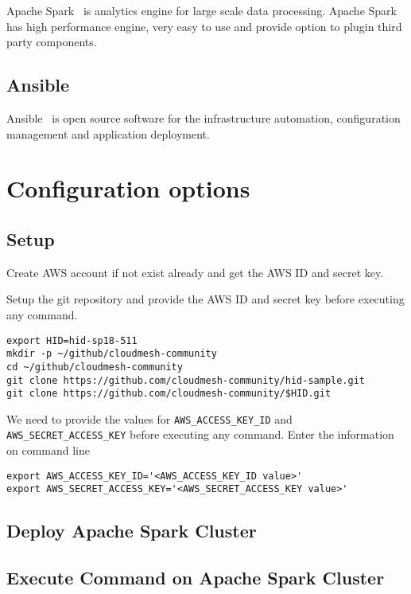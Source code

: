 Apache Spark~\cite{hid-sp18-511-www-spark} is analytics engine for
large scale data processing. Apache
Spark~\cite{hid-sp18-511-www-spark} has high performance engine, very
easy to use and provide option to plugin third party components.

\subsection{Ansible}

Ansible~\cite{hid-sp18-511-www-ansible} is open source software for
the infrastructure automation, configuration management and
application deployment.

\section{Configuration options}

\subsection{Setup}

Create AWS account if not exist already and get the AWS ID and secret key.

Setup the git repository and provide the AWS ID and secret key before executing any command.

\begin{verbatim}
export HID=hid-sp18-511
mkdir -p ~/github/cloudmesh-community
cd ~/github/cloudmesh-community
git clone https://github.com/cloudmesh-community/hid-sample.git
git clone https://github.com/cloudmesh-community/$HID.git
\end{verbatim}

We need to provide the values for \verb|AWS_ACCESS_KEY_ID| and \verb|AWS_SECRET_ACCESS_KEY| before executing any command. Enter the information on command line 

\begin{verbatim}
export AWS_ACCESS_KEY_ID='<AWS_ACCESS_KEY_ID value>'
export AWS_SECRET_ACCESS_KEY='<AWS_SECRET_ACCESS_KEY value>'
\end{verbatim}

\subsection{Deploy Apache Spark Cluster}


\subsection{Execute Command on Apache Spark Cluster}

